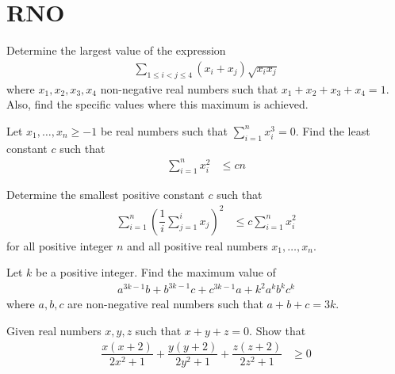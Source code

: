 \documentclass{subfile}
\begin{document}
	\section{RNO}\label{sec:rno}
	
		\begin{problem}
			Determine the largest value of the expression
				\begin{align*}
					\sum_{1\leq i<j\leq 4}(x_{i}+x_{j})\sqrt{x_{i}{x_{j}}}
				\end{align*}
			where $x_{1},x_{2},x_{3},x_{4}$ non-negative real numbers such that $x_{1}+x_{2}+x_{3}+x_{4}=1$. Also, find the specific values where this maximum is achieved.
		\end{problem}
	
		\begin{problem}
			Let $x_{1},\ldots,x_{n}\geq -1$ be real numbers such that  $\sum_{i=1}^{n}x_{i}^{3}=0$. Find the least constant $c$ such that
				\begin{align*}
					\sum_{i=1}^{n}x_{i}^{2}
						& \leq cn
				\end{align*}
		\end{problem}
	
		\begin{problem}
			Determine the smallest positive constant $c$ such that
				\begin{align*}
					\sum_{i=1}^{n}\left(\dfrac{1}{i}\sum_{j=1}^{i}x_{j}\right)^{2}
						& \leq c\sum_{i=1}^{n}x_{i}^{2}
				\end{align*}
			for all positive integer $n$ and all positive real numbers $x_{1},\ldots,x_{n}$.
		\end{problem}
	
		\begin{problem}
			Let $k$ be a positive integer. Find the maximum value of
				\begin{align*}
					a^{3k-1}b+b^{3k-1}c+c^{3k-1}a+k^{2}a^{k}b^{k}c^{k}
				\end{align*}
			where $a,b,c$ are non-negative real numbers such that $a+b+c=3k$.
		\end{problem}
	
		\begin{problem}
			Given real numbers $x,y,z$ such that $x+y+z=0$. Show that
				\begin{align*}
					\dfrac{x(x+2)}{2x^{2}+1}+\dfrac{y(y+2)}{2y^{2}+1}+\dfrac{z(z+2)}{2z^{2}+1}
						& \geq 0
				\end{align*}
		\end{problem}
	
\end{document}

